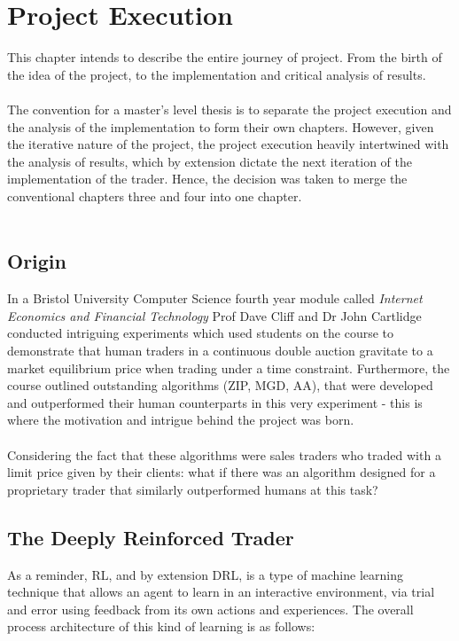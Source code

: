 \documentclass[ %
                    author={Ashwinder Khurana},
                supervisor={Prof Dave Cliff},
                    degree={MEng},
                     title={The Deeply Reinforced Trader},
                  subtitle={},
                      type={enterprise},
                      year={2020} ]{dissertation}
\begin{document}
{%

\chapter{Project Execution}
\label{chap:execution}


\noindent 
This chapter intends to describe the entire journey of project. From the birth of the idea of the project, to the implementation and critical analysis of results. 
\\
\\
The convention for a master's level thesis is to separate the project execution and the analysis of the implementation to form their own chapters. However, given the iterative nature of the project, the project execution heavily intertwined with the analysis of results, which by extension dictate the next iteration of the implementation of the trader. Hence, the decision was taken to merge the conventional chapters three and four into one chapter. 
\\
\\
\section{Origin}
In a Bristol University Computer Science fourth year module called \textit{Internet Economics and Financial Technology} Prof Dave Cliff and Dr John Cartlidge conducted intriguing experiments which used students on the course to demonstrate that human traders in a continuous double auction gravitate to a market equilibrium price when trading under a time constraint. Furthermore, the course outlined outstanding algorithms (ZIP, MGD, AA), that were developed and outperformed their human counterparts in this very experiment - this is where the motivation and intrigue behind the project was born. 
\\
\\
\noindent
Considering the fact that these algorithms were sales traders who traded with a limit price given by their clients: what if there was an algorithm designed for a proprietary trader that similarly outperformed humans at this task?

\section{The Deeply Reinforced Trader}
As a reminder, RL, and by extension DRL, is a type of machine learning technique that allows an agent to learn in an interactive environment, via trial and error using feedback from its own actions and experiences. The overall process architecture of this kind of learning is as follows: 

}
\end{document}

